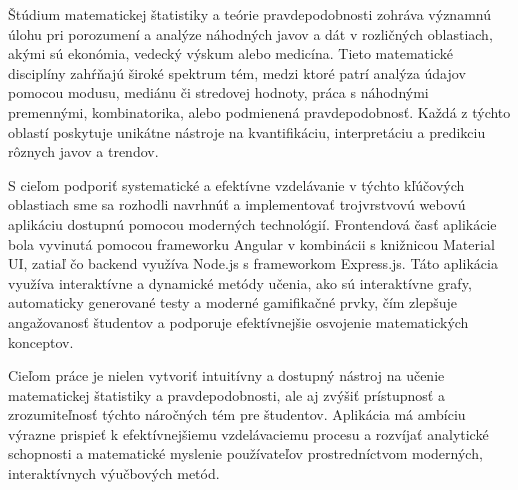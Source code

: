 Štúdium matematickej štatistiky a teórie pravdepodobnosti zohráva významnú úlohu pri porozumení a analýze náhodných javov a dát v rozličných oblastiach, akými sú ekonómia, vedecký výskum alebo medicína. 
Tieto matematické disciplíny zahŕňajú široké spektrum tém, medzi ktoré patrí analýza údajov pomocou modusu, mediánu či stredovej hodnoty, práca s náhodnými premennými, kombinatorika, alebo podmienená pravdepodobnosť. 
Každá z týchto oblastí poskytuje unikátne nástroje na kvantifikáciu, interpretáciu a predikciu rôznych javov a trendov.

S cieľom podporiť systematické a efektívne vzdelávanie v týchto kľúčových oblastiach sme sa rozhodli navrhnúť a implementovať trojvrstvovú webovú aplikáciu dostupnú pomocou moderných technológií.
Frontendová časť aplikácie bola vyvinutá pomocou frameworku Angular v kombinácii s knižnicou Material UI, zatiaľ čo backend využíva Node.js s frameworkom Express.js.
Táto aplikácia využíva interaktívne a dynamické metódy učenia, ako sú interaktívne grafy, automaticky generované testy a moderné gamifikačné prvky, čím zlepšuje angažovanosť študentov a podporuje efektívnejšie osvojenie matematických konceptov.

Cieľom práce je nielen vytvoriť intuitívny a dostupný nástroj na učenie matematickej štatistiky a pravdepodobnosti, ale aj zvýšiť prístupnosť a zrozumiteľnosť týchto náročných tém pre študentov. 
Aplikácia má ambíciu výrazne prispieť k efektívnejšiemu vzdelávaciemu procesu a rozvíjať analytické schopnosti a matematické myslenie používateľov prostredníctvom moderných, interaktívnych výučbových metód.